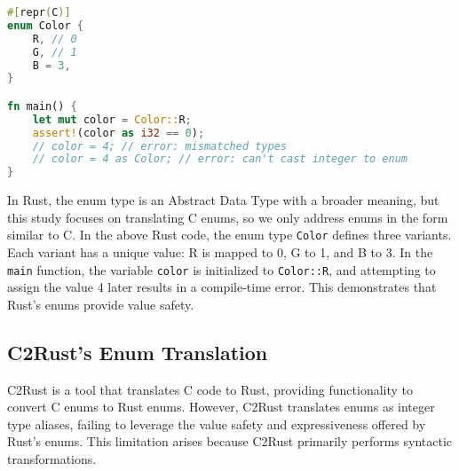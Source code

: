 \documentclass[10pt,conference]{IEEEtran}
\begin{document}
\begin{lstlisting}[language=Rust]
#[repr(C)]
enum Color {
    R, // 0
    G, // 1
    B = 3,
}

fn main() {
    let mut color = Color::R;
    assert!(color as i32 == 0);
    // color = 4; // error: mismatched types
    // color = 4 as Color; // error: can't cast integer to enum
}
\end{lstlisting}


In Rust, the enum type is an Abstract Data Type with a broader meaning, but this study focuses on translating C enums, so we only address enums in the form similar to C. In the above Rust code, the enum type \texttt{Color} defines three variants. Each variant has a unique value: R is mapped to 0, G to 1, and B to 3. In the \texttt{main} function, the variable \texttt{color} is initialized to \texttt{Color::R}, and attempting to assign the value 4 later results in a compile-time error. This demonstrates that Rust's enums provide value safety.

\subsection{C2Rust's Enum Translation}

C2Rust is a tool that translates C code to Rust, providing functionality to convert C enums to Rust enums. However, C2Rust translates enums as integer type aliases, failing to leverage the value safety and expressiveness offered by Rust's enums. This limitation arises because C2Rust primarily performs syntactic transformations.
\end{document}
